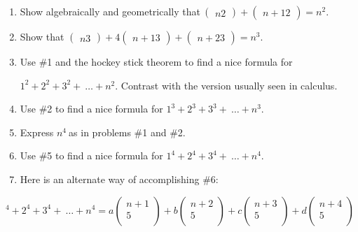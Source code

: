 \documentclass[10pt,letter]{article}
\begin{document}
\begin{enumerate}
\def\labelenumi{\arabic{enumi}.}

\item
  Show algebraically and geometrically that\(\

\begin{pmatrix}
  n 
  2 
  \end{pmatrix}
 +

\begin{pmatrix}
  n + 1 
  2 
  \end{pmatrix}
 = n^{2}\).
\item
  Show that \(

\begin{pmatrix}
  n 
  3 
  \end{pmatrix}
 + 4

\begin{pmatrix}
  n + 1 
  3 
  \end{pmatrix}
 +

\begin{pmatrix}
  n + 2 
  3 
  \end{pmatrix}
 = n^{3}\).
\item
  Use \#1 and the hockey stick theorem to find a nice formula for

\(1^{2} + 2^{2} + 3^{2} + \ \ldots + n^{2}\). Contrast with the
  version usually seen in calculus.
\item
  Use \#2 to find a nice formula for
  \(1^{3} + 2^{3} + 3^{3} + \ \ldots + n^{3}\).
\item
  Express \(n^{4}\ \)as in problems \#1 and \#2.
\item
  Use \#5 to find a nice formula for
  \(1^{4} + 2^{4} + 3^{4} + \ \ldots + n^{4}\).
\item
  Here is an alternate way of accomplishing \#6:

\end{enumerate}

\[
^{4} + 2^{4} + 3^{4} + \ \ldots + n^{4} = a\begin{pmatrix}
n + 1 \\
5 \\
\end{pmatrix} + b\begin{pmatrix}
n + 2 \\
5 \\
\end{pmatrix} + c\begin{pmatrix}
n + 3 \\
5 \\
\end{pmatrix} + d\begin{pmatrix}
n + 4 \\
5 \\
\end{pmatrix}
\]
\end{document}
